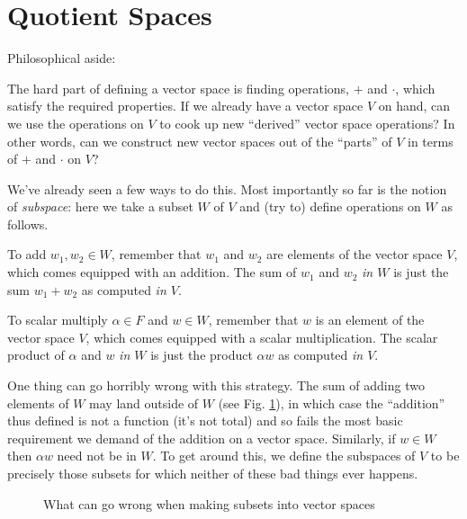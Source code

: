 \documentclass{memoir}
\begin{document}
\setcounter{section}{11}

\section{Quotient Spaces}

Philosophical aside:

\begin{framed}
The hard part of defining a vector space is finding operations, $+$ and $\cdot$, which satisfy the required properties. If we already have a vector space $V$ on hand, can we use the operations on $V$ to cook up new ``derived'' vector space operations? In other words, can we construct new vector spaces out of the ``parts'' of $V$ in terms of $+$ and $\cdot$ on $V$?
\end{framed}

We've already seen a few ways to do this. Most importantly so far is the notion of \emph{subspace}: here we take a subset $W$ of $V$ and (try to) define operations on $W$ as follows.

\begin{enumerate*}
\item To add $w_1,w_2 \in W$, remember that $w_1$ and $w_2$ are elements of the vector space $V$, which comes equipped with an addition. The sum of $w_1$ and $w_2$ \emph{in $W$} is just the sum $w_1+w_2$ as computed \emph{in $V$}.
\item To scalar multiply $\alpha \in F$ and $w \in W$, remember that $w$ is an element of the vector space $V$, which comes equipped with a scalar multiplication. The scalar product of $\alpha$ and $w$ \emph{in $W$} is just the product $\alpha w$ as computed \emph{in $V$}.
\end{enumerate*}

One thing can go horribly wrong with this strategy. The sum of adding two elements of $W$ may land outside of $W$ (see Fig. \ref{fig:sub}), in which case the ``addition'' thus defined is not a function (it's not total) and so fails the most basic requirement we demand of the addition on a vector space. Similarly, if $w \in W$ then $\alpha w$ need not be in $W$. To get around this, we define the subspaces of $V$ to be precisely those subsets for which neither of these bad things ever happens.

\begin{figure}[h]
\begin{center}
\caption{\label{fig:sub}What can go wrong when making subsets into vector spaces}
\end{center}
\end{figure}
\end{document}

